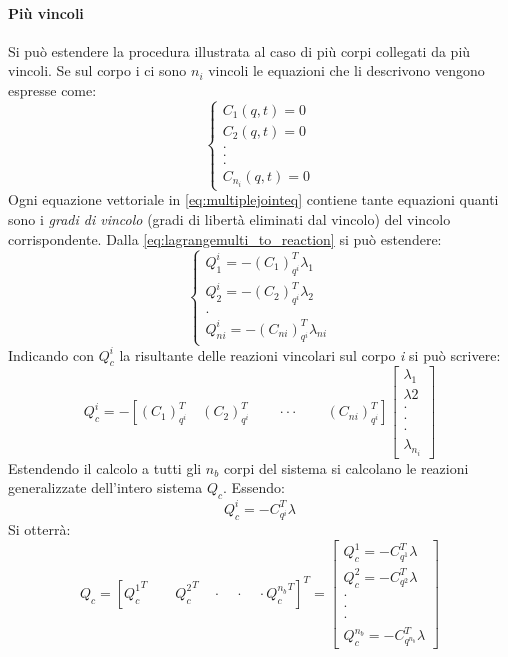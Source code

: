 \paragraph{Più vincoli}
Si può estendere la procedura illustrata al caso di più corpi collegati da più vincoli. Se sul corpo i ci sono $n_i$ vincoli le equazioni che li descrivono vengono espresse come:
\begin{equation} \label{eq:multiplejointeq} \begin{cases}
C_1(q,t) = 0 \\ C_2(q,t) = 0 \\ . \\ .\\ . \\ C_{n_i}(q,t) = 0
\end{cases}
\end{equation}
Ogni equazione vettoriale in \ref{eq:multiplejointeq} contiene tante equazioni quanti sono i \emph{gradi di vincolo} (gradi di libertà eliminati dal vincolo) del vincolo corrispondente. Dalla \ref{eq:lagrangemulti_to_reaction} si può estendere:
\begin{equation}\begin{cases}
Q_1^i = -\left( C_1 \right)^T_{q^i} \lambda_1 \\ Q_2^i = -\left( C_2 \right)^T_{q^i} \lambda_2 \\ . \\
Q_{ni}^i = -\left( C_{ni} \right)^T_{q^i} \lambda_{ni}
\end{cases} \end{equation}
Indicando con $Q^i_c$ la risultante delle reazioni vincolari sul corpo \emph{i} si può scrivere:
\begin{equation}\label{eq:reactions_result_body}
Q^i_c = -\left[ \left( C_1 \right)^T_{q^i} \quad \left( C_2 \right)^T_{q^i} \qquad \cdot\cdot\cdot 
\qquad \left( C_{ni} \right)^T_{q^i} \right] \begin{bmatrix}
\lambda_1 \\ \lambda2 \\ \cdot \\ \cdot \\ \cdot \\ \lambda_{n_i} 
\end{bmatrix} \end{equation}
Estendendo il calcolo a tutti gli $n_b$ corpi del sistema si calcolano le reazioni generalizzate dell'intero sistema $Q_c$. Essendo:
\[Q_c^i = -C^T_{q^i}\lambda\]
Si otterrà:
\begin{equation} \label{eq:sys_ge_reactions}
Q_c = \left[{Q_c^1}^T \qquad {Q_c^2}^T \quad \cdot \quad \cdot \quad \cdot {Q_c^{n_b}}^T\right]^T = \begin{bmatrix}Q_c^1 = -C^T_{q^1}\lambda \\ Q_c^2 = -C^T_{q^2}\lambda
\\ \cdot \\ \cdot \\ \cdot \\ Q_c^{n_b} = -C^T_{q^{n_b}}\lambda \end{bmatrix}
\end{equation}
